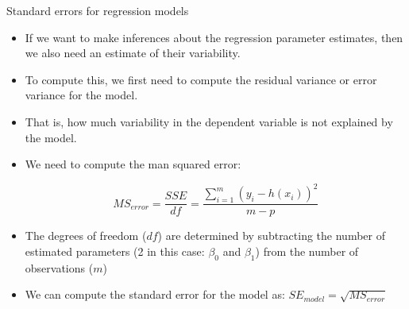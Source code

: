 \documentclass[handout]{beamer}
\begin{document}
\begin{frame}{Standard errors for regression models}
\scriptsize{
\begin{itemize}
 \item If we want to make inferences about the regression parameter estimates, then we also need an estimate of their variability. 
 \item To compute this, we first need to compute the residual variance or error variance for the model.
 \item That is, how much variability in the dependent variable is not explained by the model. 
 \item We need to compute the man squared error:
 
 \begin{displaymath}
  MS_{error} = \frac{SSE}{df} = \frac{\sum_{i=1}^{m} (y_i-h(x_i))^2}{m-p}
 \end{displaymath}

 \item The degrees of freedom ($df$) are determined by subtracting the number of estimated parameters (2 in this case: $\beta_0$ and $\beta_1$) from the number of observations ($m$)

 \item  We can compute the standard error for the model as: $SE_{model} = \sqrt{MS_{error}}$
 


 
\end{itemize}


}
 
\end{frame}
\end{document}

